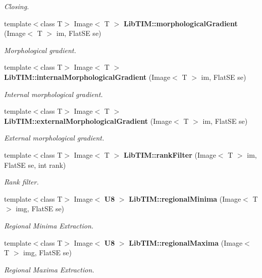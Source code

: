 \begin{CompactItemize}
\begin{CompactList}\small\item\em Closing. \item\end{CompactList}\item 
template$<$class T$>$ Image$<$ T $>$ {\bf Lib\-TIM::morphological\-Gradient} (Image$<$ T $>$ im, Flat\-SE se)
\begin{CompactList}\small\item\em Morphological gradient. \item\end{CompactList}\item 
template$<$class T$>$ Image$<$ T $>$ {\bf Lib\-TIM::internal\-Morphological\-Gradient} (Image$<$ T $>$ im, Flat\-SE se)
\begin{CompactList}\small\item\em Internal morphological gradient. \item\end{CompactList}\item 
template$<$class T$>$ Image$<$ T $>$ {\bf Lib\-TIM::external\-Morphological\-Gradient} (Image$<$ T $>$ im, Flat\-SE se)
\begin{CompactList}\small\item\em External morphological gradient. \item\end{CompactList}\item 
template$<$class T$>$ Image$<$ T $>$ {\bf Lib\-TIM::rank\-Filter} (Image$<$ T $>$ im, Flat\-SE se, int rank)
\begin{CompactList}\small\item\em Rank filter. \item\end{CompactList}\item 
template$<$class T$>$ Image$<$ {\bf U8} $>$ {\bf Lib\-TIM::regional\-Minima} (Image$<$ T $>$ img, Flat\-SE se)
\begin{CompactList}\small\item\em Regional Minima Extraction. \item\end{CompactList}\item 
template$<$class T$>$ Image$<$ {\bf U8} $>$ {\bf Lib\-TIM::regional\-Maxima} (Image$<$ T $>$ img, Flat\-SE se)
\begin{CompactList}\small\item\em Regional Maxima Extraction. \item\end{CompactList}\item 

\end{CompactItemize}
